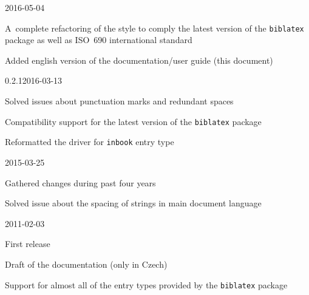 \documentclass[a4paper,10pt]{ltxdockit}
\def\t|#1|{\texttt{#1}}
\begin{document}
\begin{changelog}

\begin{release}{0.3}{2016-05-04}
\item A~complete refactoring of the style to comply the latest version of the \t|biblatex| package as well as ISO~690 international standard
\item Added english version of the documentation/user guide (this document)
\end{release}

\begin{release}{0.2.1}{2016-03-13}
\item Solved issues about punctuation marks and redundant spaces
\item Compatibility support for the latest version of the \t|biblatex| package
\item Reformatted the driver for \verb|inbook| entry type
\end{release}

\begin{release}{0.2}{2015-03-25}
\item Gathered changes during past four years
\item Solved issue about the spacing of strings in main document language
\end{release}

\begin{release}{0.1}{2011-02-03}
\item First release
\item Draft of the documentation (only in Czech)
\item Support for almost all of the entry types provided by the \t|biblatex| package
\end{release}

\end{changelog}
\end{document}
